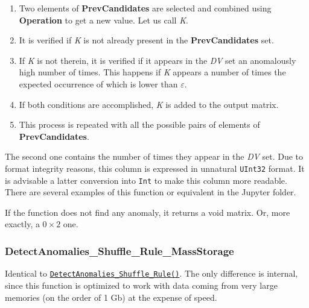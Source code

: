 \begin{itemize}
 			 \begin{enumerate}
 			 	 \item Two elements of \textbf{PrevCandidates} are selected and combined using \textbf{Operation} to get a new value. Let us call \textit{K}.
 			 	 \item It is verified if \textit{K} is not already present in the \textbf{PrevCandidates} set.
 			 	 \item If \textit{K} is not therein, it is verified if it appears in the \textit{DV} set an anomalously high number of times. This happens if \textit{K} appears a number of times the expected occurrence of which is lower than \textbf{\(\varepsilon\)}.
 			 	 \item If both conditions are accomplished, \textit{K} is added to the output matrix.
 			 	 \item This process is repeated with all the possible pairs of elements of \textbf{PrevCandidates}.
 			 \end{enumerate}
 		 
 		The second one contains the number of times they appear in the \textit{DV} set. Due to format integrity reasons, this column is expressed in unnatural \texttt{UInt32} format. It is advisable a latter conversion into \texttt{Int} to make this column more readable. There are several examples of this function or equivalent in the Jupyter folder.
 		
 		If the function does not find any anomaly, it returns a void matrix.  Or, more exactly, a \(0\times 2\) one.
 		
 \end{itemize}
 \subsubsection*{DetectAnomalies\_Shuffle\_Rule\_MassStorage}\label{Fun:DetectAnomaliesShuffleRule_MassStorage}
 Identical to \hyperref[Fun:DetectAnomaliesShuffleRule]{\texttt{DetectAnomalies\_Shuffle\_Rule()}}. The only difference is internal, since this function is optimized to work with data coming from very large memories (on the order of 1 Gb) at the expense of speed. 
